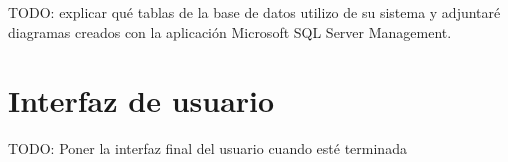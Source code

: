 
TODO: explicar qué tablas de la base de datos utilizo de su sistema y adjuntaré  diagramas creados con la aplicación Microsoft SQL Server Management. \\

\section{Interfaz de usuario}


TODO: Poner la interfaz final del usuario cuando esté terminada
